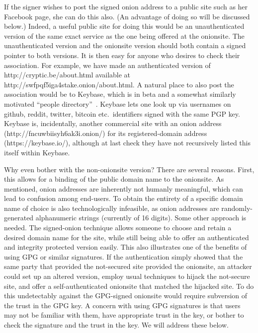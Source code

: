 \documentclass[10pt, conference, compsocconf]{styles/IEEEtran}
\begin{document}
If the signer wishes to post the signed onion address to a public site
such as her Facebook page, she can do this also. (An advantage of
doing so will be discussed below.) Indeed, a useful public site for
doing this would be an unauthenticated version of the same exact
service as the one being offered at the onionsite.  The
unauthenticated version and the onionsite version should both contain
a signed pointer to both versions. It is then easy for anyone who
desires to check their association.  For example, we have made an
authenticated version of http://cryptic.be/about.html available at
http://swfpqf5iga4stake.onion/about.html.  A natural place to also
post the association would be to Keybase, which is in beta and
a somewhat similarly motivated ``people
directory''~\cite{keybase}. Keybase lets one look up via usernames on
github, reddit, twitter, bitcoin etc.\ identifiers signed with the
same PGP key. Keybase is, incidentally, another commercial site with
an onion address (http://fncuwbiisyh6ak3i.onion/) for its
registered-domain address (https://keybase.io/), although at last
check they have not recursively listed this itself within Keybase.

Why even bother with the non-onionsite version? There are several
reasons. First, this allows for a binding of the public domain name to
the onionsite. As mentioned, onion addresses are inherently not
humanly meaningful, which can lead to confusion among end-users.  To
obtain the entirety of a specific domain name of choice is also
technologically infeasible, as onion addresses are randomly-generated
alphanumeric strings (currently of 16 digits). Some other approach is
needed. The signed-onion technique allows someone to choose and retain
a desired domain name for the site, while still being able to offer an
authenticated and integrity protected version easily. This also
illustrates one of the benefits of using GPG or similar signatures. If
the authentication simply showed that the same party that provided the
not-secured site provided the onionsite, an attacker could set up an
altered version, employ usual techniques to hijack the not-secure
site, and offer a self-authenticated onionsite that matched the
hijacked site.  To do this undetectably against the GPG-signed
onionsite would require subversion of the trust in the GPG key. A
concern with using GPG signatures is that users may not be familiar
with them, have appropriate trust in the key, or bother to check the
signature and the trust in the key. We will address these below.
\end{document}
